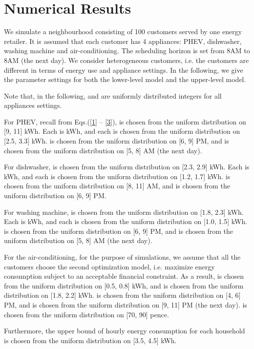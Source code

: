 \documentclass[10pt,journal]{IEEEtran}
\theoremstyle{definition}
\theoremstyle{plain} \newtheorem{theo}{Theorem} \newtheorem{prop}{Proposition}  \newtheorem{lemm}{Lemma}
\begin{document}
\section{Numerical Results} \label{results}

We simulate a neighbourhood consisting of 100 customers served by one energy retailer. It is assumed that each customer has 4 appliances: PHEV, dishwasher, washing machine and air-conditioning. The scheduling horizon is set from 8AM to 8AM (the next day). We consider heterogeneous customers, i.e. the customers are different in terms of energy use and appliance settings. In the following, we give the parameter settings for both the lower-level model and the upper-level model. 


Note that, in the following,  and  are uniformly distributed integers for all appliances settings.



For PHEV, recall from Eqs.(\ref{1} -- \ref{3}),  is chosen from the uniform distribution on [9, 11] kWh. Each  is  kWh, and each  is chosen  from the uniform distribution on [2.5, 3.3] kWh.  is chosen from the uniform distribution on [6, 9] PM, and  is chosen from the uniform distribution on [5, 8] AM (the next day).

For dishwasher,  is chosen from the uniform distribution on [2.3, 2.9] kWh. Each  is  kWh, and each  is chosen from the uniform distribution on [1.2, 1.7] kWh.  is chosen from the uniform distribution on [8, 11] AM, and  is chosen from the uniform distribution on [6, 9] PM. 

For washing machine,  is chosen from the uniform distribution on [1.8, 2.3] kWh. Each  is  kWh, and each  is chosen from the uniform distribution on [1.0, 1.5] kWh.  is chosen from the uniform distribution on [6, 9] PM, and  is chosen from the uniform distribution on [5, 8] AM (the next day).  

For the air-conditioning, for the purpose of simulations, we assume that all the customers choose the second optimization model, i.e. maximize energy consumption subject to an acceptable financial constraint. As a result,  is chosen from the uniform distribution on [0.5, 0.8] kWh, and  is chosen from the uniform distribution on [1.8, 2.2] kWh.  is chosen from the uniform distribution on [4, 6] PM, and  is chosen from the uniform distribution on [9, 11] PM (the next day).
 is chosen from the uniform distribution on [70, 90] pence. 

Furthermore, the upper bound of hourly energy consumption for each household  is chosen from the uniform distribution on [3.5, 4.5] kWh. 
\end{document}
